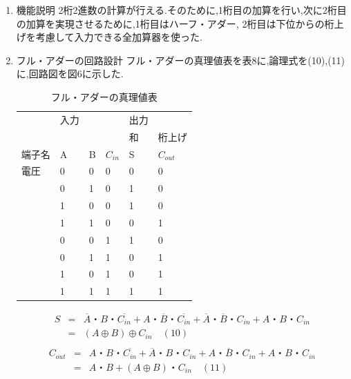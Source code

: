 \documentclass[twocolumn, 10pt,a4j]{jsarticle}
\begin{document}
    \begin{enumerate}
    \item 機能説明
      2桁2進数の計算が行える.そのために,1桁目の加算を行い,次に2桁目の加算を実現させるために,1桁目はハーフ・アダー,
      2桁目は下位からの桁上げを考慮して入力できる全加算器を使った.
    \item フル・アダーの回路設計
      フル・アダーの真理値表を表8に,論理式を(10),(11)に,回路図を図6に示した.
      \begin{table}[H]
        \centering
        \caption{フル・アダーの真理値表}
        \label{my-label}
        \begin{tabular}{l|lll|ll}
            & 入力 &   &          & 出力 &           \\ \cline{5-6} 
            &    &   &          & 和  & 桁上げ       \\ \hline
        端子名 & A  & B & $C_{in}$ & S  & $C_{out}$ \\ \hline
        電圧  & 0  & 0 & 0        & 0  & 0         \\
            & 0  & 1 & 0        & 1  & 0         \\
            & 1  & 0 & 0        & 1  & 0         \\
            & 1  & 1 & 0        & 0  & 1         \\
            & 0  & 0 & 1        & 1  & 0         \\
            & 0  & 1 & 1        & 0  & 1         \\
            & 1  & 0 & 1        & 0  & 1         \\
            & 1  & 1 & 1        & 1  & 1        
        \end{tabular}
      \end{table}
      \begin{center}
        \begin{eqnarray*}
          S &=& \overline{A}・B・\overline{C_{in}} + A・\overline{B}・\overline{C_{in}}
           + \overline{A}・\overline{B}・C_{in} + A・B・C_{in} \\
          &=& (A \oplus B) \oplus C_{in} \quad(10) \\
        \end{eqnarray*}
        \begin{eqnarray*}
          C_{out} &=& A・B・\overline{C_{in}} + \overline{A}・B・C_{in}
           + A・\overline{B}・C_{in} + A・B・C_{in} \\
          &=& A・B + (A \oplus B)・C_{in} \quad(11) \\

\end{eqnarray*}
\end{center}
\end{enumerate}
\end{document}
